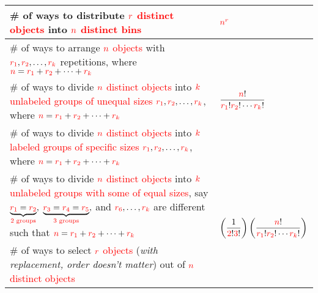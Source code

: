 \documentclass[12pt,addpoints,answers]{exam}
\begin{document}
\begin{questions}
\begin{center}
\begin{tabular}{|p{}|M{0.2\textwidth}|}
\# of ways to distribute ${{\mathcolor{red}r}}$ \textcolor{red}{distinct objects} into ${{\mathcolor{red}n}}$ \textcolor{red}{distinct bins}&  \\
\hline
\# of ways to arrange ${{\mathcolor{red}n}}$ \textcolor{red}{objects} with ${{\mathcolor{red}{r_1}}},{{\mathcolor{red}{r_2}}},\ldots,{{\mathcolor{red}{r_k}}}$ repetitions, where \mbox{${{\mathcolor{red}n}} =  {{\mathcolor{red}{r_1}}}+{{\mathcolor{red}{r_2}}}+\cdots+{{\mathcolor{red}{r_k}}}$}  & \\
\# of ways to divide ${{\mathcolor{red}n}}$ \textcolor{red}{distinct objects} into ${{\mathcolor{red}k}}$ \textcolor{red}{unlabeled groups of unequal sizes} ${{\mathcolor{red}{r_1}}},{{\mathcolor{red}{r_2}}},\ldots,{{\mathcolor{red}{r_k}}}$, where ${{\mathcolor{red}n}} =  {{\mathcolor{red}{r_1}}}+{{\mathcolor{red}{r_2}}}+\cdots+{{\mathcolor{red}{r_k}}}$&   \\
\# of ways to divide ${{\mathcolor{red}n}}$ \textcolor{red}{distinct objects} into ${{\mathcolor{red}k}}$ \textcolor{red}{labeled groups of specific sizes} ${{\mathcolor{red}{r_1}}},{{\mathcolor{red}{r_2}}},\ldots,{{\mathcolor{red}{r_k}}}$, where ${{\mathcolor{red}n}} =  {{\mathcolor{red}{r_1}}}+{{\mathcolor{red}{r_2}}}+\cdots+{{\mathcolor{red}{r_k}}}$ & \\
\hline
\# of ways to divide ${{\mathcolor{red}n}}$ \textcolor{red}{distinct objects} into ${{\mathcolor{red}k}}$ \textcolor{red}{unlabeled groups with some of equal sizes}, say $\underbrace{{{\mathcolor{red}{r_1}}}={{\mathcolor{red}{r_2}}}}_{\textcolor{red}{\text{2 groups}}},$ $\underbrace{{{\mathcolor{red}{r_3}}}={{\mathcolor{red}{r_4}}}={{\mathcolor{red}{r_5}}}}_{\textcolor{red}{\text{3 groups}}},$ and ${{\mathcolor{red}{r_6}}},\ldots,{{\mathcolor{red}{r_k}}}$ are different such that ${{\mathcolor{red}n}} =  {{\mathcolor{red}{r_1}}}+{{\mathcolor{red}{r_2}}}+\cdots+{{\mathcolor{red}{r_k}}}$ &  \\
\hline
\# of ways to select ${{\mathcolor{red}r}}$ \textcolor{red}{objects} (\emph{with replacement, order doesn't matter}) out of ${{\mathcolor{red}n}}$ \textcolor{red}{distinct objects}  & \\

\end{tabular}
\end{center}
\end{questions}
\end{document}
